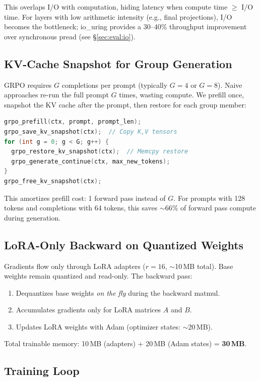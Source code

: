 \documentclass[sigconf,review,anonymous]{acmart}
\begin{document}
This overlaps I/O with computation, hiding latency when compute time $\geq$ I/O time. For layers with low arithmetic intensity (e.g., final projections), I/O becomes the bottleneck; io\_uring provides a 30--40\% throughput improvement over synchronous pread (see \S\ref{sec:eval:io}).

\subsection{KV-Cache Snapshot for Group Generation}

GRPO requires $G$ completions per prompt (typically $G=4$ or $G=8$). Naive approaches re-run the full prompt $G$ times, wasting compute. We prefill once, snapshot the KV cache after the prompt, then restore for each group member:

\begin{lstlisting}[language=C]
grpo_prefill(ctx, prompt, prompt_len);
grpo_save_kv_snapshot(ctx);  // Copy K,V tensors
for (int g = 0; g < G; g++) {
  grpo_restore_kv_snapshot(ctx);  // Memcpy restore
  grpo_generate_continue(ctx, max_new_tokens);
}
grpo_free_kv_snapshot(ctx);
\end{lstlisting}

This amortizes prefill cost: 1 forward pass instead of $G$. For prompts with 128 tokens and completions with 64 tokens, this saves $\sim$66\% of forward pass compute during generation.

\subsection{LoRA-Only Backward on Quantized Weights}

Gradients flow only through LoRA adapters ($r=16$, $\sim$10\,MB total). Base weights remain quantized and read-only. The backward pass:
\begin{enumerate}
\item Dequantizes base weights \emph{on the fly} during the backward matmul.
\item Accumulates gradients only for LoRA matrices $A$ and $B$.
\item Updates LoRA weights with Adam (optimizer states: $\sim$20\,MB).
\end{enumerate}

Total trainable memory: 10\,MB (adapters) + 20\,MB (Adam states) = \textbf{30\,MB}.

\subsection{Training Loop}
\end{document}
